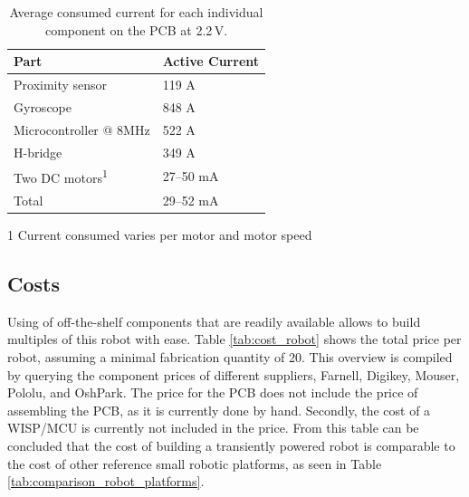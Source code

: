 \begin{table}[t]
	\centering
	\begin{threeparttable}
		\caption{Average consumed current for each individual component on the PCB at 2.2\,V.}
		\label{tab:avg_cur_comp}
		\begin{tabular}{|l|l|} 
			\hline
			Part & Active Current \\
			\hline\hline
			Proximity sensor & 119 \textmu A \\
			Gyroscope & 848 \textmu A\\	
			Microcontroller @ 8MHz & 522 \textmu A\\
			H-bridge & 349 \textmu A \\
			Two DC motors\textsuperscript{1} & 27--50 mA  \\
			\hline \hline
			Total & 29--52 mA \\
			\hline
		\end{tabular}
		\begin{tablenotes}
		\small
		\item [1] Current consumed varies per motor and motor speed
		\end{tablenotes}
	\end{threeparttable}
\end{table}

\subsection{Costs}

Using of off-the-shelf components that are readily available allows to build multiples of this robot with ease.
Table \ref{tab:cost_robot} shows the total price per robot, assuming a minimal fabrication quantity of 20.
This overview is compiled by querying the component prices of different suppliers, Farnell, Digikey, Mouser, Pololu, and OshPark.
The price for the PCB does not include the price of assembling the PCB, as it is currently done by hand.
Secondly, the cost of a WISP/MCU is currently not included in the price.
From this table can be concluded that the cost of building a transiently powered robot is comparable to the cost of other reference small robotic platforms, as seen in Table \ref{tab:comparison_robot_platforms}.


